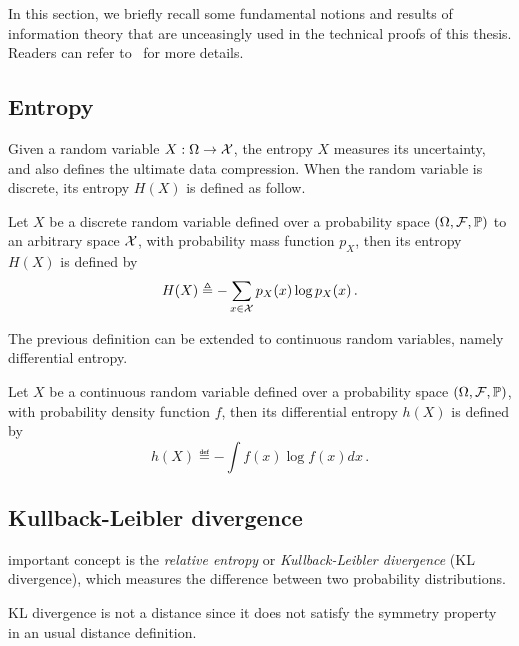 In this section, we briefly recall some fundamental notions and results of information theory that are unceasingly used in the technical proofs of this thesis. Readers can refer to~\cite{cover2006} for more details.

\subsection{Entropy}\label{app:maths.information.entropy}

Given a random variable $X: \Omega \rightarrow \mathcal{X}$, the \gls{entropy} $X$ measures its uncertainty, and also defines the ultimate data compression. When the random variable is discrete, its entropy $H(X)$ is defined as follow.

\begin{definition}[entropy]\label{def:entropy}
\begin{leftbar}[defnbar]
    Let $X$ be a discrete random variable defined over a probability space $(\Omega,\mathcal{F},\mathbb{P})$ to an arbitrary space $\mathcal{X}$, with probability mass function $p_X$, then its entropy $H(X)$ is defined by
    \[
        H(X) \triangleq - \sum_{x\in\mathcal{X}} p_X(x)\log p_X(x)\,.
    \]
\end{leftbar}
\end{definition}

The previous definition can be extended to continuous random variables, namely \gls{differential entropy}.

\begin{definition}
\begin{leftbar}[defnbar]
    Let $X$ be a continuous random variable defined over a probability space $(\Omega,\mathcal{F},\mathbb{P})$, with probability density function $f$, then its differential entropy $h(X)$ is defined by
    \[
        h(X) \eqdef - \int f(x)\log f(x) dx\,.
    \]
\end{leftbar}
\end{definition}

\subsection{Kullback-Leibler divergence}\label{app:maths.information.kl}

 important concept is the \textit{relative entropy} or \textit{Kullback-Leibler divergence} (KL divergence), which measures the difference between two probability distributions.

\begin{remark}
\begin{leftbar}[remarkbar]
	KL divergence is not a distance since it does not satisfy the symmetry property in an usual distance definition.
\end{leftbar}
\end{remark}

